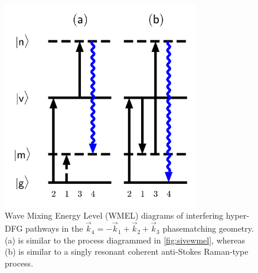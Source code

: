 \documentclass[aip, jcp, reprint, onecolumn]{revtex4-2}
\begin{document}
\begin{figure}[!htbp]
	\centering
	\includegraphics[width=3.375in]{figures/wmel2.png}
	\caption{Wave Mixing Energy Level (WMEL) diagrams of interfering hyper-DFG pathways in the  $\vec{k}_4 = -\vec{k}_1 + \vec{k}_2 + \vec{k}_3$ phasematching geometry. 
		(a) is similar to the process diagrammed in \autoref{fig:sivewmel}, whereas (b) is similar to a singly resonant coherent anti-Stokes Raman-type process.
		}
	\label{fig:sivewmel2}
\end{figure}
\end{document}
